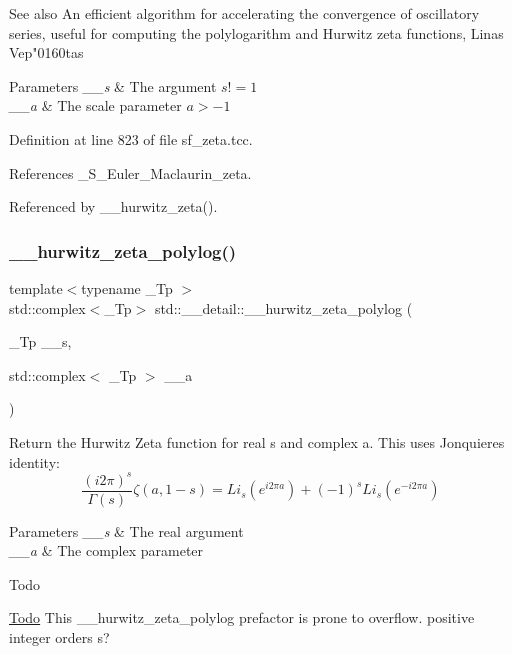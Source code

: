 \begin{DoxySeeAlso}{See also}
An efficient algorithm for accelerating the convergence of oscillatory series, useful for computing the polylogarithm and Hurwitz zeta functions, Linas Vep"0160tas
\end{DoxySeeAlso}

\begin{DoxyParams}{Parameters}
{\em \+\_\+\+\_\+s} & The argument $ s != 1 $ \\
\hline
{\em \+\_\+\+\_\+a} & The scale parameter $ a > -1 $ \\
\hline
\end{DoxyParams}


Definition at line 823 of file sf\+\_\+zeta.\+tcc.



References \+\_\+\+S\+\_\+\+Euler\+\_\+\+Maclaurin\+\_\+zeta.



Referenced by \+\_\+\+\_\+hurwitz\+\_\+zeta().

\mbox{\label{namespacestd_1_1____detail_a7c45415c3ec0e137eea2364a6dd3af4e}} 
\subsubsection{\texorpdfstring{\+\_\+\+\_\+hurwitz\+\_\+zeta\+\_\+polylog()}{\_\_hurwitz\_zeta\_polylog()}}
{\footnotesize\ttfamily template$<$typename \+\_\+\+Tp $>$ \\
std\+::complex$<$\+\_\+\+Tp$>$ std\+::\+\_\+\+\_\+detail\+::\+\_\+\+\_\+hurwitz\+\_\+zeta\+\_\+polylog (\begin{DoxyParamCaption}\item[{\+\_\+\+Tp}]{\+\_\+\+\_\+s,  }\item[{std\+::complex$<$ \+\_\+\+Tp $>$}]{\+\_\+\+\_\+a }\end{DoxyParamCaption})}

Return the Hurwitz Zeta function for real s and complex a. This uses Jonquiere\textquotesingle{}s identity\+: \[ \frac{(i2\pi)^s}{\Gamma(s)}\zeta(a,1-s) = Li_s(e^{i2\pi a}) + (-1)^s Li_s(e^{-i2\pi a}) \] 
\begin{DoxyParams}{Parameters}
{\em \+\_\+\+\_\+s} & The real argument \\
\hline
{\em \+\_\+\+\_\+a} & The complex parameter \\
\hline
\end{DoxyParams}
\begin{DoxyRefDesc}{Todo}
\item[\hyperlink{todo__todo000014}{Todo}]This \+\_\+\+\_\+hurwitz\+\_\+zeta\+\_\+polylog prefactor is prone to overflow. positive integer orders s? \end{DoxyRefDesc}


